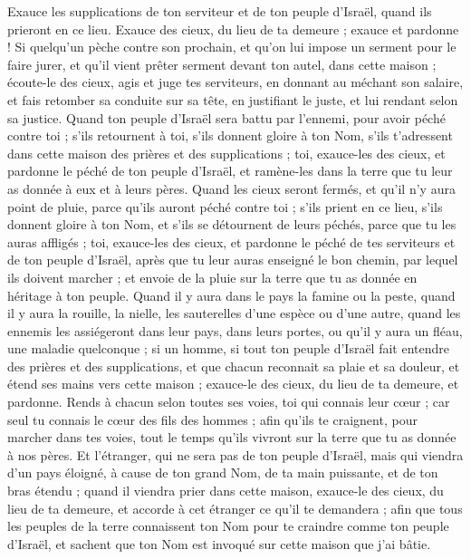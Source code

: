 \begin{multicols}{2}
Exauce les supplications de ton serviteur et de ton peuple d'Israël, quand ils prieront en ce lieu. Exauce des cieux, du lieu de ta demeure ; exauce et pardonne !
Si quelqu'un pèche contre son prochain, et qu'on lui impose un serment pour le faire jurer, et qu'il vient prêter serment devant ton autel, dans cette maison ;
écoute-le des cieux, agis et juge tes serviteurs, en donnant au méchant son salaire, et fais retomber sa conduite sur sa tête, en justifiant le juste, et lui rendant selon sa justice.
Quand ton peuple d'Israël sera battu par l'ennemi, pour avoir péché contre toi ; s'ils retournent à toi, s'ils donnent gloire à ton Nom, s'ils t'adressent dans cette maison des prières et des supplications ;
toi, exauce-les des cieux, et pardonne le péché de ton peuple d'Israël, et ramène-les dans la terre que tu leur as donnée à eux et à leurs pères.
Quand les cieux seront fermés, et qu'il n'y aura point de pluie, parce qu'ils auront péché contre toi ; s'ils prient en ce lieu, s'ils donnent gloire à ton Nom, et s'ils se détournent de leurs péchés, parce que tu les auras affligés ;
toi, exauce-les des cieux, et pardonne le péché de tes serviteurs et de ton peuple d'Israël, après que tu leur auras enseigné le bon chemin, par lequel ils doivent marcher ; et envoie de la pluie sur la terre que tu as donnée en héritage à ton peuple.
Quand il y aura dans le pays la famine ou la peste, quand il y aura la rouille, la nielle, les sauterelles d'une espèce ou d'une autre, quand les ennemis les assiégeront dans leur pays, dans leurs portes, ou qu'il y aura un fléau, une maladie quelconque ;
si un homme, si tout ton peuple d'Israël fait entendre des prières et des supplications, et que chacun reconnait sa plaie et sa douleur, et étend ses mains vers cette maison ;
exauce-le des cieux, du lieu de ta demeure, et pardonne. Rends à chacun selon toutes ses voies, toi qui connais leur cœur ; car seul tu connais le cœur des fils des hommes ;
afin qu'ils te craignent, pour marcher dans tes voies, tout le temps qu'ils vivront sur la terre que tu as donnée à nos pères.
Et l'étranger, qui ne sera pas de ton peuple d'Israël, mais qui viendra d'un pays éloigné, à cause de ton grand Nom, de ta main puissante, et de ton bras étendu ; quand il viendra prier dans cette maison,
exauce-le des cieux, du lieu de ta demeure, et accorde à cet étranger ce qu'il te demandera ; afin que tous les peuples de la terre connaissent ton Nom pour te craindre comme ton peuple d'Israël, et sachent que ton Nom est invoqué sur cette maison que j'ai bâtie.

\end{multicols}
